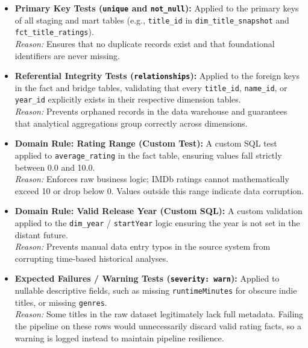 \documentclass[runningheads]{llncs}
\begin{document}
\begin{itemize}
    \item \textbf{Primary Key Tests (\texttt{unique} and \texttt{not\_null}):} Applied to the primary keys of all staging and mart tables (e.g., \texttt{title\_id} in \texttt{dim\_title\_snapshot} and \texttt{fct\_title\_ratings}).
    \\ \textit{Reason:} Ensures that no duplicate records exist and that foundational identifiers are never missing.

    \item \textbf{Referential Integrity Tests (\texttt{relationships}):} Applied to the foreign keys in the fact and bridge tables, validating that every \texttt{title\_id}, \texttt{name\_id}, or \texttt{year\_id} explicitly exists in their respective dimension tables.
    \\ \textit{Reason:} Prevents orphaned records in the data warehouse and guarantees that analytical aggregations group correctly across dimensions.

    \item \textbf{Domain Rule: Rating Range (Custom Test):} A custom SQL test applied to \texttt{average\_rating} in the fact table, ensuring values fall strictly between 0.0 and 10.0.
    \\ \textit{Reason:} Enforces raw business logic; IMDb ratings cannot mathematically exceed 10 or drop below 0. Values outside this range indicate data corruption.

    \item \textbf{Domain Rule: Valid Release Year (Custom SQL):} A custom validation applied to the \texttt{dim\_year} / \texttt{startYear} logic ensuring the year is not set in the distant future.
    \\ \textit{Reason:} Prevents manual data entry typos in the source system from corrupting time-based historical analyses.

    \item \textbf{Expected Failures / Warning Tests (\texttt{severity: warn}):} Applied to nullable descriptive fields, such as missing \texttt{runtimeMinutes} for obscure indie titles, or missing \texttt{genres}.
    \\ \textit{Reason:} Some titles in the raw dataset legitimately lack full metadata. Failing the pipeline on these rows would unnecessarily discard valid rating facts, so a warning is logged instead to maintain pipeline resilience.
\end{itemize}
\end{document}
